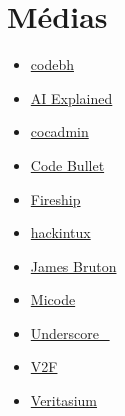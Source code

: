 \documentclass[12pt]{article}
\begin{document}
\section{Médias}
\begin{itemize}
    \item \href{https://www.youtube.com/@codebh}{codebh}
    \item \href{https://www.youtube.com/@aiexplained-official}{AI Explained}
    \item \href{https://www.youtube.com/@cocadmin}{cocadmin}
    \item \href{https://www.youtube.com/@CodeBullet}{Code Bullet}
    \item \href{https://www.youtube.com/@Fireship}{Fireship}
    \item \href{https://www.youtube.com/@hackintux5813}{hackintux}
    \item \href{https://www.youtube.com/@jamesbruton}{James Bruton}
    \item \href{https://www.youtube.com/@Micode}{Micode}
    \item \href{https://www.youtube.com/@Underscore_}{Underscore\_}
    \item \href{https://www.youtube.com/@V2F}{V2F}
    \item \href{https://www.youtube.com/@veritasium}{Veritasium}
\end{itemize}
\end{document}
